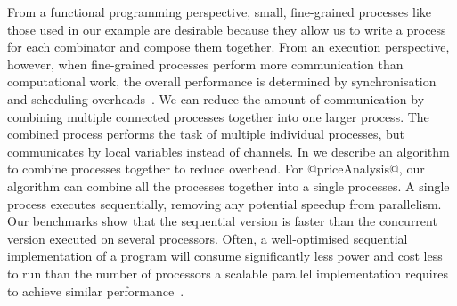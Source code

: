 
From a functional programming perspective, small, fine-grained processes like those used in our example are desirable because they allow us to write a process for each combinator and compose them together.
From an execution perspective, however, when fine-grained processes perform more communication than computational work, the overall performance is determined by synchronisation and scheduling overheads~\cite{chen1990impact}.
We can reduce the amount of communication by combining multiple connected processes together into one larger process.
The combined process performs the task of multiple individual processes, but communicates by local variables instead of channels.
In  we describe an algorithm to combine processes together to reduce overhead.
For @priceAnalysis@, our algorithm can combine all the processes together into a single processes.
A single process executes sequentially, removing any potential speedup from parallelism.
Our benchmarks  show that the sequential version is faster than the concurrent version executed on several processors.
Often, a well-optimised sequential implementation of a program will consume significantly less power and cost less to run than the number of processors a scalable parallel implementation requires to achieve similar performance~\cite{mcsherry2015scalability}.


